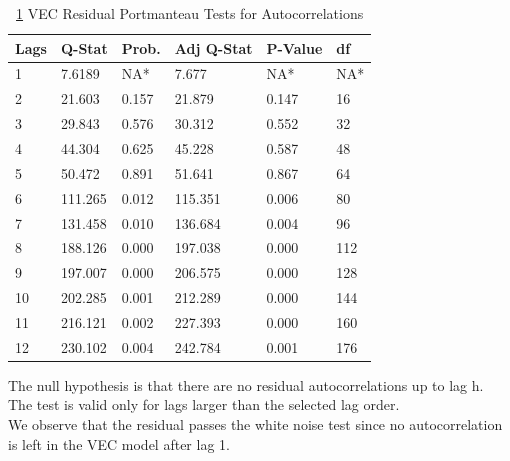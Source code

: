\documentclass{beamer}
\begin{document}
	\begin{frame}
		
		\begin{table}
			\caption{ \ref{table:residual_port_test} VEC Residual Portmanteau Tests for Autocorrelations}
			\label{table:residual_port_test}
			\begin{tabular}{llllll}
				\toprule
				Lags & Q-Stat & Prob. & Adj Q-Stat & P-Value & df \\
				\midrule
				
				1 & 7.6189 & NA* & 7.677 & NA* & NA* \\ [5pt]
				2 &21.603 & 0.157 & 21.879 & 0.147 & 16 \\
				3 & 29.843 & 0.576 & 30.312 & 0.552 & 32 \\
				4 & 44.304 & 0.625 & 45.228 & 0.587 & 48 \\
				5 & 50.472 & 0.891 & 51.641 & 0.867 & 64 \\
				6 & 111.265 & 0.012 & 115.351 & 0.006 & 80 \\
				7 & 131.458 & 0.010 & 136.684 & 0.004 & 96 \\
				8 & 188.126 & 0.000 & 197.038 & 0.000 & 112 \\
				9 & 197.007 & 0.000 & 206.575 & 0.000 & 128 \\
				10 & 202.285 & 0.001 & 212.289 & 0.000 & 144 \\
				11 & 216.121 & 0.002 & 227.393 & 0.000 & 160 \\
				12 & 230.102 & 0.004 & 242.784 & 0.001 & 176 \\
				
				\bottomrule
			\end{tabular}
		\end{table}
	\end{frame}
	\begin{frame}
		\begin{block}{}
			The null hypothesis is that there are no residual autocorrelations up to lag h. \\ The test is valid only for lags larger than the selected lag order. \\ We observe that the residual passes the white noise test since no autocorrelation is left in the VEC model after lag 1.
		\end{block}
	\end{frame}
	
	
	
\end{document}
